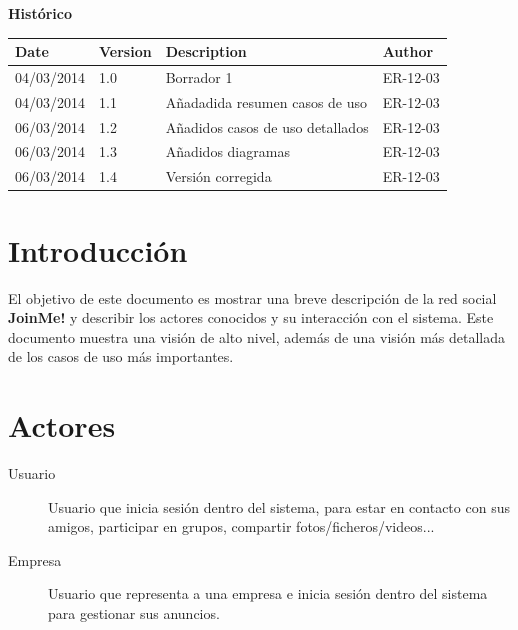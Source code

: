 \documentclass[12pt, a4paper, titlepage]{article}
\begin{document}
\begin{titlepage}
\vspace{2cm}
\begin{center}
	\large{\textbf{Histórico}}
	
    \begin{tabular}{ | p{4cm} | p{2cm} | p{5cm} | p{4cm} |}
    \hline
    \textbf{Date} & \textbf{Version} & \textbf{Description} & \textbf{Author} \\ \hline
    04/03/2014 & 1.0 & Borrador 1  & ER-12-03  \\ \hline
     04/03/2014 & 1.1 & Añadadida resumen casos de uso & ER-12-03  \\ \hline
     06/03/2014 & 1.2 & Añadidos casos de uso detallados & ER-12-03  \\ \hline
     06/03/2014 & 1.3 & Añadidos diagramas & ER-12-03  \\ \hline
     06/03/2014 & 1.4 & Versión corregida & ER-12-03  \\ \hline
    \end{tabular}
\end{center}

\end{titlepage}
\clearpage


\tableofcontents
\clearpage

\section{Introducción}

El objetivo de este documento es mostrar una breve descripción de la red social \textbf{JoinMe!} y describir los actores conocidos y su interacción con el sistema.
Este documento muestra una visión de alto nivel, además de una visión más detallada de los casos de uso más importantes.

\section{Actores}
\begin{description}

\item [Usuario] Usuario que inicia sesión dentro del sistema, para estar en contacto con sus amigos, participar en grupos, compartir fotos/ficheros/videos...

\item [Empresa] Usuario que representa a una empresa e inicia sesión dentro del sistema para gestionar sus anuncios.

\end{description}
\end{document}
